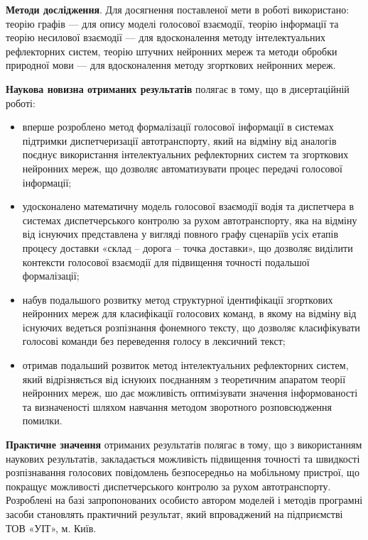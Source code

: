 \textbf{Методи дослідження}. Для досягнення поставленої мети в роботі використано: теорію графів --- для опису моделі голосової взаємодії, теорію інформації та теорію несилової взаємодії --- для вдосконалення методу інтелектуальних рефлекторних систем, теорію штучних нейронних мереж та методи обробки природної мови --- для вдосконалення методу згорткових нейронних мереж.

\textbf{Наукова новизна отриманих результатів} полягає в тому, що в дисертаційній роботі:

\begin{itemize}
	\item вперше розроблено метод формалізації голосової інформації в системах підтримки диспетчеризації автотранспорту, який на відміну від аналогів поєднує використання інтелектуальних рефлекторних систем та згорткових нейронних мереж, що дозволяє автоматизувати процес передачі голосової інформації;
	\item удосконалено математичну модель голосової взаємодії водія та диспетчера в системах диспетчерського контролю за рухом автотранспорту, яка на відміну від існуючих представлена у вигляді повного графу сценаріїв усіх етапів процесу доставки «склад – дорога – точка доставки», що дозволяє виділити контексти голосової взаємодії для підвищення точності подальшої формалізації;
	\item набув подальшого розвитку метод структурної ідентифікації згорткових нейронних мереж для класифікації голосових команд, в якому на відміну від існуючих ведеться розпізнання фонемного тексту, що дозволяє класифікувати голосові команди без переведення голосу в лексичний текст;
	\item отримав подальший розвиток метод інтелектуальних рефлекторних систем, який відрізняється від існуюих поєднанням з теоретичним апаратом теорії нейронних мереж, шо дає можливість оптимізувати значення інформованості та визначеності шляхом навчання методом зворотного розповсюдження помилки.
\end{itemize}

\textbf{Практичне значення} отриманих результатів полягає в тому, що з використанням наукових результатів, закладається можливість підвищення точності та швидкості розпізнавання голосових повідомлень безпосередньо на мобільному пристрої, що покращує можливості диспетчерського контролю за рухом автотранспорту. Розроблені на базі запропонованих особисто автором моделей і методів програмні засоби становлять практичний результат, який впроваджений на підприємстві ТОВ «УІТ», м. Київ.

